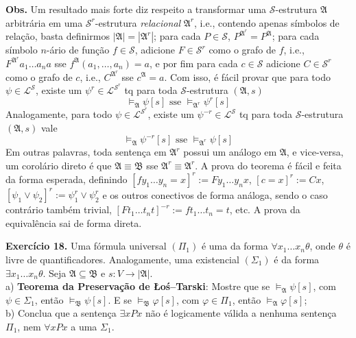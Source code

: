 \documentclass[11pt]{article}
\newcommand{\mc}[1]{\mathcal{#1}}
\newcommand{\mf}[1]{\mathfrak{#1}}
\begin{document}
\begin{shaded}
\textbf{Obs.} Um resultado mais forte diz respeito a transformar uma $\mc{S}$-estrutura $\mf{A}$ arbitrária em uma $\mc{S}^r$-estrutura \textit{relacional} $\mf{A}^r$, i.e., contendo apenas símbolos de relação, basta definirmos $|\mf{A}|=|\mf{A}^r|$; para cada $P\in\mc{S}$, $P^{\mf{A}^r}=P^\mf{A}$; para cada símbolo $n$-ário de função $f\in\mc{S}$, adicione $F\in\mc{S}^r$ como o grafo de $f$, i.e., $F^{\mf{A}^r}a_1\dots a_na$ sse $f^\mf{A}(a_1,\dots,a_n)=a$, e por fim para cada $c\in\mc{S}$ adicione $C\in\mc{S}^r$ como o grafo de $c$, i.e., $C^{\mf{A}^r}$ sse $c^\mf{A}=a$. Com isso, é fácil provar que para todo $\psi\in\mc{L}^\mc{S}$, existe um $\psi^r\in\mc{L}^{\mc{S}^r}$ tq para toda $\mc{S}$-estrutura $(\mf{A},s)$
$$\vDash_\mf{A}\psi[s]\text{ sse }\vDash_{\mf{A}^r}\psi^r[s]$$
Analogamente, para todo $\psi\in\mc{L}^{\mc{S}^r}$, existe um $\psi^{-r}\in\mc{L}^\mc{S}$ tq para toda $\mc{S}$-estrutura $(\mf{A},s)$ vale
$$\vDash_\mf{A}\psi^{-r}[s]\text{ sse }\vDash_{\mf{A}^r}\psi[s]$$
Em outras palavras, toda sentença em $\mf{A}^r$ possui um análogo em $\mf{A}$, e vice-versa, um corolário direto é que $\mf{A}\equiv\mf{B}$ sse $\mf{A}^r\equiv\mf{A}^r$. A prova do teorema é fácil e feita da forma esperada, definindo $[fy_1\dots y_n=x]^r:=Fy_1\dots y_nx$, $[c=x]^r:=Cx$, $[\psi_1\vee\psi_2]^r:=\psi_1^r\vee\psi_2^r$ e os outros conectivos de forma análoga, sendo o caso contrário também trivial, $[Ft_1\dots t_nt]^{-r}:=ft_1\dots t_n=t$, etc. A prova da equivalência sai de forma direta.
\end{shaded}

\begin{shaded}
\textbf{Exercício 18.} Uma fórmula universal $(\Pi_1)$ é uma da forma $\forall x_1\dots x_n\theta$, onde $\theta$ é livre de quantificadores. Analogamente, uma existencial $(\Sigma_1)$ é da forma $\exists x_1\dots x_n\theta$. Seja $\mf{A}\subseteq\mf{B}$ e $s:V\to|\mf{A}|$.\\
a) \textbf{Teorema da Preservação de Łoś–Tarski}: Mostre que se $\vDash_\mf{A}\psi[s]$, com $\psi\in\Sigma_1$, então $\vDash_\mf{B}\psi[s]$. E se $\vDash_\mf{B}\varphi[s]$, com $\varphi\in\Pi_1$, então $\vDash_\mf{A}\varphi[s]$;\\
b) Conclua que a sentença $\exists xPx$ não é logicamente válida a nenhuma sentença $\Pi_1$, nem $\forall x Px$ a uma $\Sigma_1$.
\end{shaded}
\end{document}
